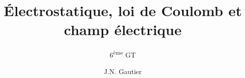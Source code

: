 

\subject{Physique(2h)}
\title{\Huge{Électrostatique, loi de Coulomb et champ électrique}}
\subtitle{6\textsuperscript{ème} GT}
\author {J.N. Gautier}
\date{}



\tableofcontents




